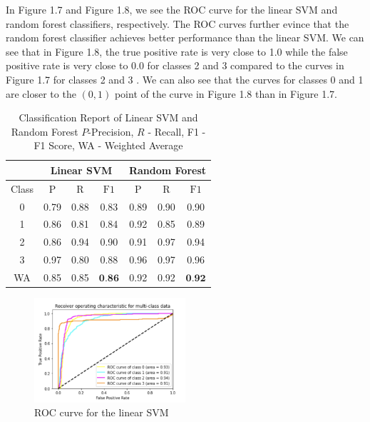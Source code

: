 In Figure 1.7 and Figure 1.8, we see the ROC curve for the linear SVM and random forest classifiers, respectively. The ROC curves further evince that the random forest classifier achieves better performance than the linear SVM. We can see that in Figure 1.8, the true positive rate is very close to 1.0 while the false positive rate is very close to 0.0 for classes 2 and 3 compared to the curves in Figure 1.7 for classes 2 and 3 . We can also see that the curves for classes 0 and 1 are closer to the $(0,1)$ point of the curve in Figure 1.8 than in Figure 1.7.

\begin{table}
    \centering
    \caption{Classification Report of Linear SVM and Random Forest $P$-Precision, $R$ - Recall, F1 - F1 Score, WA - Weighted Average}
    
    \begin{tabular}{|c|c|c|c|c|c|c|}
    \hline
     & \multicolumn{3}{|c|}{Linear SVM} & \multicolumn{3}{|c|}{Random Forest} \\
    \hline
    Class & $\mathrm{P}$ & $\mathrm{R}$ & $\mathrm{F} 1$ & $\mathrm{P}$ & $\mathrm{R}$ & $\mathrm{F} 1$ \\
    \hline
    0 & 0.79 & 0.88 & 0.83 & 0.89 & 0.90 & 0.90 \\
    \hline
    1 & 0.86 & 0.81 & 0.84 & 0.92 & 0.85 & 0.89 \\
    \hline
    2 & 0.86 & 0.94 & 0.90 & 0.91 & 0.97 & 0.94 \\
    \hline
    3 & 0.97 & 0.80 & 0.88 & 0.96 & 0.97 & 0.96 \\
    \hline
    WA & 0.85 & 0.85 & $\mathbf{0 . 8 6}$ & 0.92 & 0.92 & $\mathbf{0 . 9 2}$ \\
    \hline
    \end{tabular}
    
\end{table}

\begin{figure}[H]
    \centering
    \includegraphics[width=0.5\textwidth]{Images/ROC-curve-SVM.png}
    \caption{ROC curve for the linear SVM}
\end{figure}

